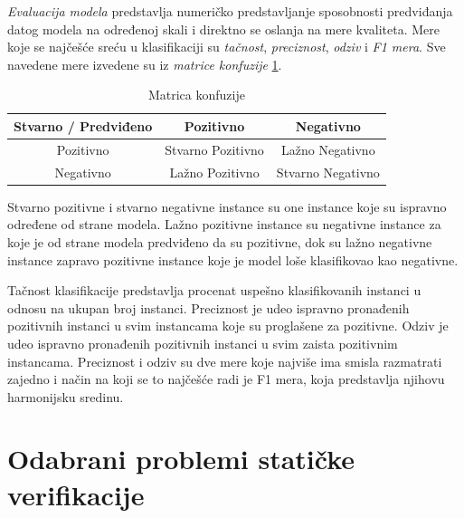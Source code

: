 \documentclass[a4paper]{article}
\begin{document}
\textit{Evaluacija modela} predstavlja numeričko predstavljanje sposobnosti 
predviđanja datog modela na određenoj skali i direktno se oslanja na mere 
kvaliteta. Mere koje se najčešće sreću u klasifikaciji su \textit{tačnost}, 
\textit{preciznost}, \textit{odziv} i \textit{F1 mera}. Sve navedene mere 
izvedene su iz \textit{matrice konfuzije} \ref{table:matrica_konfuzije}.

\begin{table}[h]
	\centering
	\begin{tabular}{ |c|cc| } 
		\hline
		Stvarno / Predviđeno & Pozitivno & Negativno \\ 
		\hline
		Pozitivno & Stvarno Pozitivno & Lažno Negativno \\ 
		Negativno & Lažno Pozitivno & Stvarno Negativno \\ 
		\hline
	\end{tabular}
	\caption{Matrica konfuzije}
	\label{table:matrica_konfuzije}
\end{table}

Stvarno pozitivne i stvarno negativne instance su one instance koje su ispravno 
određene od strane modela. Lažno pozitivne instance su negativne instance za koje 
je od strane modela predviđeno da su pozitivne, dok su lažno negativne instance 
zapravo pozitivne instance koje je model loše klasifikovao kao negativne. 

Tačnost klasifikacije predstavlja procenat uspešno klasifikovanih instanci u odnosu 
na ukupan broj instanci. Preciznost je udeo ispravno pronađenih pozitivnih instanci 
u svim instancama koje su proglašene za pozitivne. Odziv je udeo ispravno pronađenih 
pozitivnih instanci u svim zaista pozitivnim instancama. Preciznost i odziv su dve 
mere koje najviše ima smisla razmatrati zajedno i način na koji se to najčešće radi 
je F1 mera, koja predstavlja njihovu harmonijsku sredinu.



\section{Odabrani problemi statičke verifikacije}
\label{sec:naslovN}
\end{document}
